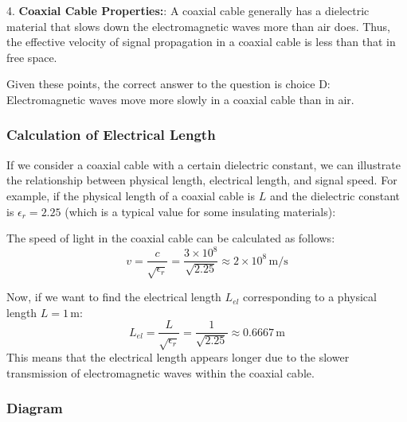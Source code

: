 4. \textbf{Coaxial Cable Properties:}: 
   A coaxial cable generally has a dielectric material that slows down the electromagnetic waves more than air does. Thus, the effective velocity of signal propagation in a coaxial cable is less than that in free space.

Given these points, the correct answer to the question is choice D: Electromagnetic waves move more slowly in a coaxial cable than in air.

\subsubsection*{Calculation of Electrical Length}

If we consider a coaxial cable with a certain dielectric constant, we can illustrate the relationship between physical length, electrical length, and signal speed. For example, if the physical length of a coaxial cable is \( L \) and the dielectric constant is \( \epsilon_r = 2.25 \) (which is a typical value for some insulating materials):

The speed of light in the coaxial cable can be calculated as follows:
\[
v = \frac{c}{\sqrt{\epsilon_r}} = \frac{3 \times 10^8}{\sqrt{2.25}} \approx 2 \times 10^8 \, \text{m/s}
\]

Now, if we want to find the electrical length \( L_{el} \) corresponding to a physical length \( L = 1 \, \text{m} \):
\[
L_{el} = \frac{L}{\sqrt{\epsilon_r}} = \frac{1}{\sqrt{2.25}} \approx 0.6667 \, \text{m}
\]
This means that the electrical length appears longer due to the slower transmission of electromagnetic waves within the coaxial cable.

\subsubsection*{Diagram}

